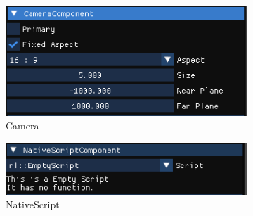 \begin{figure}[h]
    \begin{subfigure}[b]{0.24\linewidth}
        \begin{center}
        \includegraphics[width=\linewidth]{./resources/editor/ins_camera.png}
        \caption{Camera}
        \end{center}
    \end{subfigure}
    \begin{subfigure}[b]{0.24\linewidth}
        \begin{center}
        \includegraphics[width=\linewidth]{./resources/editor/ins_script.png}
        \caption{NativeScript}
        \end{center}
    \end{subfigure}
    \begin{subfigure}[b]{0.24\linewidth}
        \begin{center}

\end{center}
\end{subfigure}
\end{figure}
